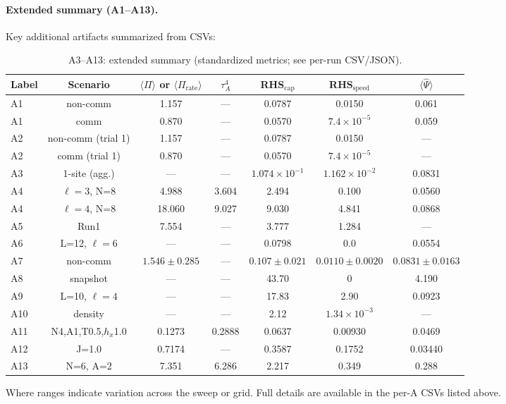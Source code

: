 \documentclass[10pt]{article}
\begin{document}
\paragraph{Extended summary (A1--A13).}
Key additional artifacts summarized from CSVs:
\begin{table}[!ht]
\centering
\caption{A3--A13: extended summary (standardized metrics; see per-run CSV/JSON).}
\label{tab:annex-extended}
\begin{tabular}{@{}lcccccc@{}}
\toprule
Label & Scenario & $\langle\Pi\rangle$ or $\langle\Pi_{\mathrm{rate}}\rangle$ & $\tau_A^4$ & RHS$_{\mathrm{cap}}$ & RHS$_{\mathrm{speed}}$ & $\langle\widehat{\Psi}\rangle$ \\
\midrule
A1 & non-comm & 1.157 & — & 0.0787 & 0.0150 & 0.061 \\
A1 & comm     & 0.870 & — & 0.0570 & $7.4\times10^{-5}$ & 0.059 \\
A2 & non-comm (trial 1) & 1.157 & — & 0.0787 & 0.0150 & — \\
A2 & comm (trial 1)    & 0.870 & — & 0.0570 & $7.4\times10^{-5}$ & — \\
A3 & 1-site (agg.) & — & — & $1.074\!\times\!10^{-1}$ & $1.162\!\times\!10^{-2}$ & 0.0831 \\
A4 & $\ell{=}3$, N=8 & 4.988 & 3.604 & 2.494 & 0.100 & 0.0560 \\
A4 & $\ell{=}4$, N=8 & 18.060 & 9.027 & 9.030 & 4.841 & 0.0868 \\
A5 & Run1 & 7.554 & — & 3.777 & 1.284 & — \\
A6 & L=12, $\ell{=}6$ & — & — & 0.0798 & 0.0 & 0.0554 \\
A7 & non-comm & $1.546\pm0.285$ & — & $0.107\pm0.021$ & $0.0110\pm0.0020$ & $0.0831\pm0.0163$ \\
A8 & snapshot & — & — & 43.70 & 0 & 4.190 \\
A9 & L=10, $\ell{=}4$ & — & — & 17.83 & 2.90 & 0.0923 \\
A10 & density & — & — & 2.12 & $1.34\times10^{-3}$ & — \\
A11 & N4,A1,T0.5,$h_x$1.0 & 0.1273 & 0.2888 & 0.0637 & 0.00930 & 0.0469 \\
A12 & J=1.0 & 0.7174 & — & 0.3587 & 0.1752 & 0.03440 \\
A13 & N=6, A=2 & 7.351 & 6.286 & 2.217 & 0.349 & 0.288 \\
\bottomrule
\end{tabular}
\end{table}

Where ranges indicate variation across the sweep or grid. Full details are available in the per-A CSVs listed above.
\end{document}
